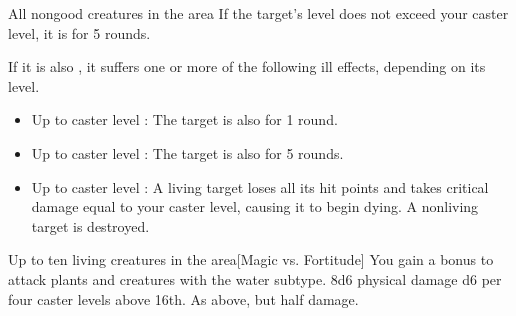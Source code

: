 \begin{spellheader}
\end{spellheader}
\begin{spelleffects}
    \begin{spelltargets}{All nongood creatures in the area}
        \spelleffect If the target's level does not exceed your caster level, it is \deafened for 5 rounds.

        If it is also \bloodied, it suffers one or more of the following ill effects, depending on its level.
        \begin{itemize}
            \item Up to caster level : The target is also \blinded for 1 round.
            \item Up to caster level : The target is also \paralyzed for 5 rounds.
            \item Up to caster level : A living target loses all its hit points and takes critical damage equal to your caster level, causing it to begin dying. A nonliving target is destroyed.
        \end{itemize}
    \end{spelltargets}
\end{spelleffects}
\begin{spellfooter}
    
\end{spellfooter}

\begin{spellheader}
\end{spellheader}
\begin{spelleffects}
    \begin{spelltargets}{Up to ten living creatures in the area}[Magic vs. Fortitude]
        \spellspecial You gain a  bonus to attack plants and creatures with the water subtype.
        \spellsuccess 8d6 physical damage \add d6 per four caster levels above 16th.
        \spellfailure As above, but half damage.
    \end{spelltargets}
\end{spelleffects}
\begin{spellfooter}
    
\end{spellfooter}

